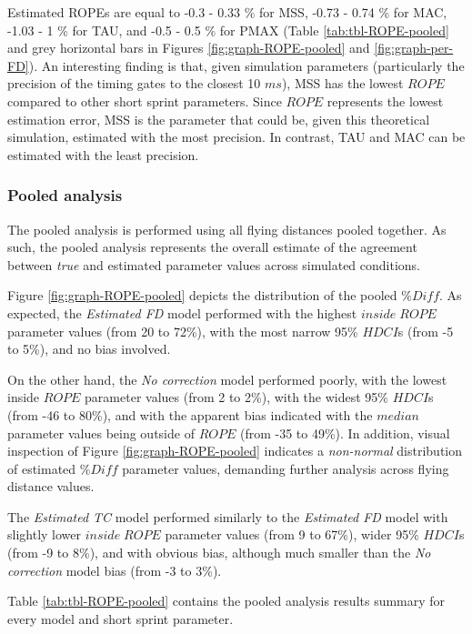 \documentclass[fleqn,10pt]{wlpeerj} %
\begin{document}
Estimated ROPEs are equal to -0.3 - 0.33 \% for MSS, -0.73 - 0.74 \% for MAC, -1.03 - 1 \% for TAU, and -0.5 - 0.5 \% for PMAX (Table \ref{tab:tbl-ROPE-pooled} and grey horizontal bars in Figures \ref{fig:graph-ROPE-pooled} and \ref{fig:graph-per-FD}). An interesting finding is that, given simulation parameters (particularly the precision of the timing gates to the closest 10 \(ms\)), MSS has the lowest \(ROPE\) compared to other short sprint parameters. Since \(ROPE\) represents the lowest estimation error, MSS is the parameter that could be, given this theoretical simulation, estimated with the most precision. In contrast, TAU and MAC can be estimated with the least precision.

\hypertarget{pooled-analysis}{%
\subsubsection{Pooled analysis}\label{pooled-analysis}}

The pooled analysis is performed using all flying distances pooled together. As such, the pooled analysis represents the overall estimate of the agreement between \emph{true} and estimated parameter values across simulated conditions.

Figure \ref{fig:graph-ROPE-pooled} depicts the distribution of the pooled \(\%Diff\). As expected, the \emph{Estimated FD} model performed with the highest \(inside \; ROPE\) parameter values (from 20 to 72\%), with the most narrow 95\% \(HDCI\)s (from -5 to 5\%), and no bias involved.

On the other hand, the \emph{No correction} model performed poorly, with the lowest inside \(ROPE\) parameter values (from 2 to 2\%), with the widest 95\% \(HDCI\)s (from -46 to 80\%), and with the apparent bias indicated with the \(median\) parameter values being outside of \(ROPE\) (from -35 to 49\%). In addition, visual inspection of Figure \ref{fig:graph-ROPE-pooled} indicates a \emph{non-normal} distribution of estimated \(\%Diff\) parameter values, demanding further analysis across flying distance values.

The \emph{Estimated TC} model performed similarly to the \emph{Estimated FD} model with slightly lower \(inside \; ROPE\) parameter values (from 9 to 67\%), wider 95\% \(HDCI\)s (from -9 to 8\%), and with obvious bias, although much smaller than the \emph{No correction} model bias (from -3 to 3\%).

Table \ref{tab:tbl-ROPE-pooled} contains the pooled analysis results summary for every model and short sprint parameter.
\end{document}
